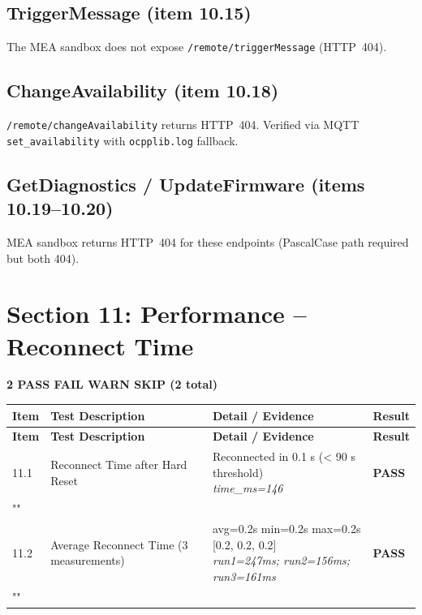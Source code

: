 \documentclass[10pt, a4paper]{article}
\begin{document}
\subsection*{TriggerMessage (item 10.15)}
The MEA sandbox does not expose \texttt{/remote/triggerMessage} (HTTP~404).

\subsection*{ChangeAvailability (item 10.18)}
\texttt{/remote/changeAvailability} returns HTTP~404.
Verified via MQTT \texttt{set\_availability} with \texttt{ocpplib.log} fallback.

\subsection*{GetDiagnostics / UpdateFirmware (items 10.19--10.20)}
MEA sandbox returns HTTP~404 for these endpoints (PascalCase path required but both 404).



\newpage
\section{Section 11: Performance -- Reconnect Time}
\textbf{2 PASS  FAIL  WARN  SKIP \quad (2 total)}

\renewcommand{\arraystretch}{1.35}
\begin{longtable}{|L{1cm}|L{5.5cm}|M{7cm}|C{1.8cm}|}
\hline
{}
\textbf{Item} & \small\textbf{Test Description} & \small\textbf{Detail / Evidence} & \small\textbf{Result} \\
\hline
\endfirsthead
\hline
{}
\textbf{Item} & \small\textbf{Test Description} & \small\textbf{Detail / Evidence} & \small\textbf{Result} \\
\hline
\endhead
\hline
\endfoot
\small 11.1 & \small Reconnect Time after Hard Reset & Reconnected in 0.1 s (< 90 s threshold){\newline\normalfont\footnotesize\itshape time\_ms=146} & \textcolor{passgreen}{\textbf{PASS}} \\
\hline
{} \\
\hline
\small 11.2 & \small Average Reconnect Time (3 measurements) & avg=0.2s min=0.2s max=0.2s [0.2, 0.2, 0.2]{\newline\normalfont\footnotesize\itshape run1=247ms; run2=156ms; run3=161ms} & \textcolor{passgreen}{\textbf{PASS}} \\
\hline
{} \\
\hline
\end{longtable}
\normalsize
\end{document}
